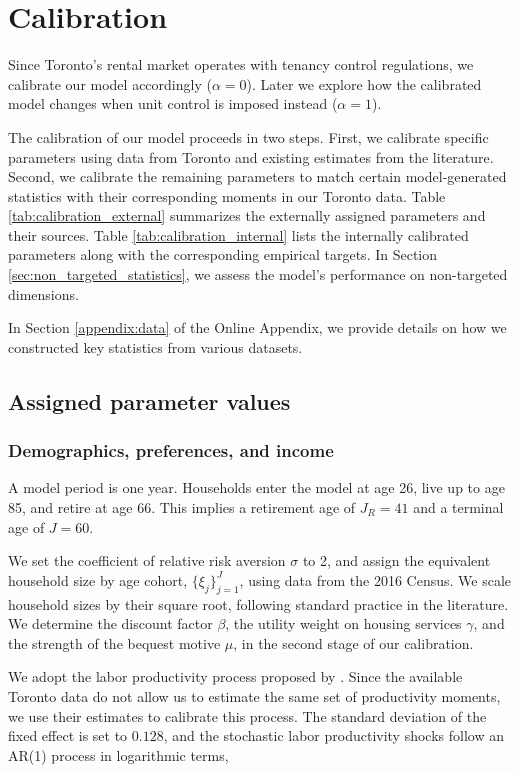 \documentclass[parskip=full]{article}
\begin{document}
\section{Calibration}\label{sec:calibration}

Since Toronto's rental market operates with tenancy control regulations, we calibrate our model accordingly ($\alpha=0$). Later we explore how the calibrated model changes when unit control is imposed instead ($\alpha=1$).

The calibration of our model proceeds in two steps. First, we calibrate specific parameters using data from Toronto and existing estimates from the literature. Second, we calibrate the remaining parameters to match certain model-generated statistics with their corresponding moments in our Toronto data. Table \ref{tab:calibration_external} summarizes the externally assigned parameters and their sources. Table \ref{tab:calibration_internal} lists the internally calibrated parameters along with the corresponding empirical targets. In Section \ref{sec:non_targeted_statistics}, we assess the model's performance on non-targeted dimensions.

In Section \ref{appendix:data} of the Online Appendix, we provide details on how we constructed key statistics from various datasets. 

\subsection{Assigned parameter values}\label{sec:external_calibration}

\subsubsection{Demographics, preferences, and income}
A model period is one year. Households enter the model at age 26, live up to age 85, and retire at age 66. This implies a retirement age of $J_{R}=41$ and a terminal age of $J=60$. 

We set the coefficient of relative risk aversion $\sigma$ to 2, and assign the equivalent household size by age cohort, $\{\xi_{j}\}_{j=1}^{J}$, using data from the 2016 Census. We scale household sizes by their square root, following standard practice in the literature. We determine the discount factor $\beta$, the utility weight on housing services $\gamma$, and the strength of the bequest motive $\mu$, in the second stage of our calibration.

We adopt the labor productivity process proposed by \citet{gkkoc}. Since the available Toronto data do not allow us to estimate the same set of productivity moments, we use their estimates to calibrate this process. The standard deviation of the fixed effect is set to $0.128$, and the stochastic labor productivity shocks follow an AR(1) process in logarithmic terms,
\end{document}
